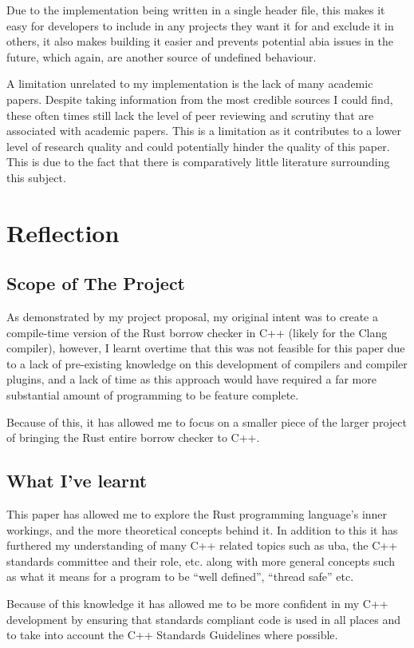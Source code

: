 \documentclass[a4paper]{article}
\begin{document}
Due to the implementation being written in a single header file, this makes it easy for developers to include in any projects they want it for and exclude it in others, it also makes building it easier and prevents potential \gls{abia} issues in the future, which again, are another source of undefined behaviour.

A limitation unrelated to my implementation is the lack of many academic papers. Despite taking information from the most credible sources I could find, these often times still lack the level of peer reviewing and scrutiny that are associated with academic papers. This is a limitation as it contributes to a lower level of research quality and could potentially hinder the quality of this paper. This is due to the fact that there is comparatively little literature surrounding this subject.

\section{Reflection}
\subsection{Scope of The Project}
As demonstrated by my project proposal, my original intent was to create a compile-time version of the Rust borrow checker in C++ (likely for the Clang compiler), however, I learnt overtime that this was not feasible for this paper due to a lack of pre-existing knowledge on this development of compilers and compiler plugins, and a lack of time as this approach would have required a far more substantial amount of programming to be feature complete.

Because of this, it has allowed me to focus on a smaller piece of the larger project of bringing the Rust entire borrow checker to C++.
\subsection{What I've learnt}
This paper has allowed me to explore the Rust programming language's inner workings, and the more theoretical concepts behind it. In addition to this it has furthered my understanding of many C++ related topics such as \gls{uba}, the C++ standards committee and their role, etc. along with more general concepts such as what it means for a program to be ``well defined'', ``thread safe'' etc.

Because of this knowledge it has allowed me to be more confident in my C++ development by ensuring that standards compliant code is used in all places and to take into account the C++ Standards Guidelines where possible.
\end{document}
